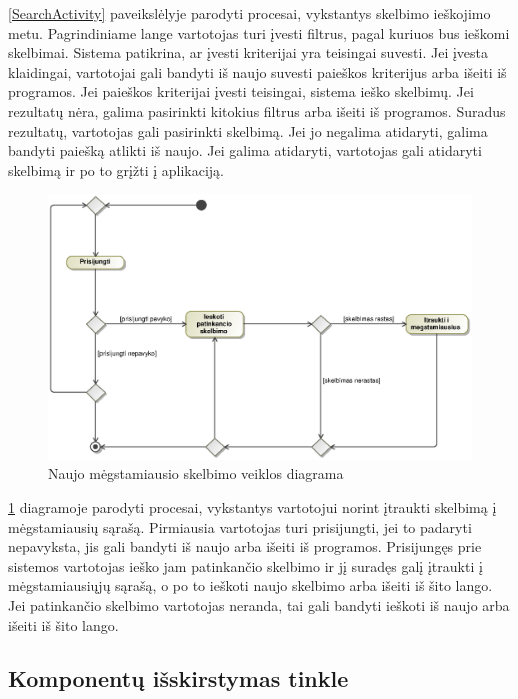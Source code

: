 \documentclass[12pt]{article}
\begin{document}
	\ref{SearchActivity} paveikslėlyje parodyti procesai, vykstantys skelbimo ieškojimo metu. Pagrindiniame lange vartotojas turi įvesti filtrus, pagal kuriuos bus ieškomi skelbimai. Sistema patikrina, ar įvesti kriterijai yra teisingai suvesti. Jei įvesta klaidingai, vartotojai gali bandyti iš naujo suvesti paieškos kriterijus arba išeiti iš programos. Jei paieškos kriterijai įvesti teisingai, sistema ieško skelbimų. Jei rezultatų nėra, galima pasirinkti kitokius filtrus arba išeiti iš programos. Suradus rezultatų, vartotojas gali pasirinkti skelbimą. Jei jo negalima atidaryti, galima bandyti paiešką atlikti iš naujo. Jei galima atidaryti, vartotojas gali atidaryti skelbimą ir po to grįžti į aplikaciją.
	\pagebreak

	\begin{figure}[h]
		\begin{center}
			\includegraphics[width=\textwidth]{MegstamiausiuVeikla.eps}
			\caption{Naujo mėgstamiausio skelbimo veiklos diagrama\label{FavActivity}}
		\end{center}
	\end{figure}
	
	\ref{FavActivity} diagramoje parodyti procesai, vykstantys vartotojui norint įtraukti skelbimą į mėgstamiausių sąrašą. Pirmiausia vartotojas turi prisijungti, jei to padaryti nepavyksta, jis gali bandyti iš naujo arba išeiti iš programos. Prisijungęs prie sistemos vartotojas ieško jam patinkančio skelbimo ir jį suradęs galį įtraukti į mėgstamiausiųjų sąrašą, o po to ieškoti naujo skelbimo arba išeiti iš šito lango. Jei patinkančio skelbimo vartotojas neranda, tai gali bandyti ieškoti iš naujo arba išeiti iš šito lango.
	\pagebreak
	
	\subsection{Komponentų išskirstymas tinkle}
\end{document}
